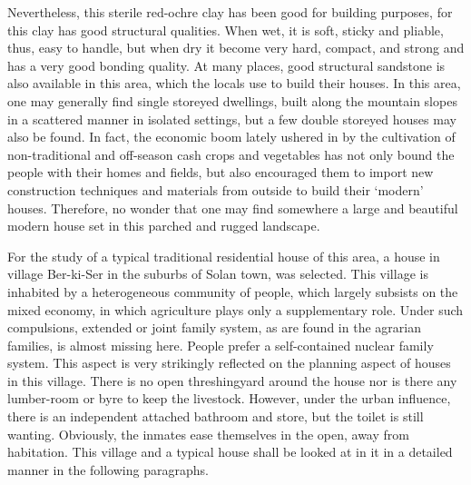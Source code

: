 Nevertheless, this sterile red-ochre clay has been good for building purposes, for this clay has good structural qualities. When wet, it is soft, sticky and pliable, thus, easy to handle, but when dry it become very hard, compact, and strong and has a very good bonding quality. At many places, good structural sandstone is also available in this area, which the locals use to build their houses. In this area, one may generally find single storeyed dwellings, built along the mountain slopes in a scattered manner in isolated settings, but a few double storeyed houses may also be found. In fact, the economic boom lately ushered in by the cultivation of non-traditional and off-season cash crops and vegetables has not only bound the people with their homes and fields, but also encouraged them to import new construction techniques and materials from outside to build their ‘modern’ houses. Therefore, no wonder that one may find somewhere a large and beautiful modern house set in this parched and rugged landscape.

For the study of a typical traditional residential house of this area, a house in village Ber-ki-Ser in the suburbs of Solan town, was selected. This village is inhabited by a heterogeneous community of people, which largely subsists on the mixed economy, in which agriculture plays only a supplementary role. Under such compulsions, extended or joint family system, as are found in the agrarian families, is almost missing here. People prefer a self-contained nuclear family system. This aspect is very strikingly reflected on the planning aspect of houses in this village. There is no open threshingyard around the house nor is there any lumber-room or byre to keep the livestock. However, under the urban influence, there is an independent attached bathroom and store, but the toilet is still wanting. Obviously, the inmates ease themselves in the open, away from habitation. This village and a typical house shall be looked at in it in a detailed manner in the following paragraphs.

